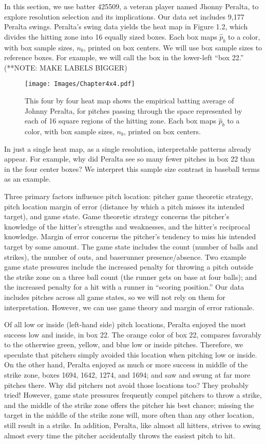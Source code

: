 In this section, we use batter 425509, a veteran player named Jhonny Peralta, to explore resolution selection and its implications. Our data set includes 9,177 Peralta swings. Peralta's swing data yields the heat map in Figure 1.2, which divides the hitting zone into 16 equally sized boxes. Each box maps $\hat{p}_{b}$ to a color, with box sample sizes, $n_{b}$, printed on box centers. We will use box sample sizes to reference boxes. For example, we will call the box in the lower-left ``box 22.'' (**NOTE: MAKE LABELS BIGGER)
        \begin{figure}[H]
      	\centering
      	\texttt{[image: Images/Chapter4x4.pdf]} 
      	\caption{This four by four heat map shows the empirical batting average of Johnny Peralta, for pitches passing through the space represented by each of 16 square regions of the hitting zone. Each box maps $\hat{p}_{b}$ to a color, with box sample sizes, $n_{b}$, printed on box centers.}
      	\end{figure} 
In just a single heat map, as a single resolution, interpretable patterns already appear. For example, why did Peralta see so many fewer pitches in box 22 than in the four center boxes?  We interpret this sample size contrast in baseball terms as an example. 

Three primary factors influence pitch location: pitcher game theoretic strategy, pitch location margin of error (distance by which a pitch misses its intended target), and game state. Game theoretic strategy concerns the pitcher's knowledge of the hitter's strengths and weaknesses, and the hitter's reciprocal knowledge. Margin of error concerns the pitcher's tendency to miss his intended target by some amount. The game state includes the count (number of balls and strikes), the number of outs, and baserunner presence/absence. Two example game state pressures include the increased penalty for throwing a pitch outside the strike zone on a three ball count (the runner gets on base at four balls); and the increased penalty for a hit with a runner in ``scoring position.'' Our data includes pitches across all game states, so we will not rely on them for interpretation. However, we can use game theory and margin of error rationale. 

Of all low or inside (left-hand side) pitch locations, Peralta enjoyed the most success low and inside, in box 22. The orange color of box 22, compares favorably to the otherwise green, yellow, and blue low or inside pitches. Therefore, we speculate that pitchers simply avoided this location when pitching low or inside. On the other hand, Peralta enjoyed as much or more success in middle of the strike zone, boxes 1694, 1642, 1274, and 1694; and saw and swung at far more pitches there. Why did pitchers not avoid those locations too? They probably tried! However, game state pressures frequently compel pitchers to throw a strike, and the middle of the strike zone offers the pitcher his best chance; missing the target in the middle of the strike zone will, more often than any other location, still result in a strike. In addition, Peralta, like almost all hitters, strives to swing almost every time the pitcher accidentally throws the easiest pitch to hit.


